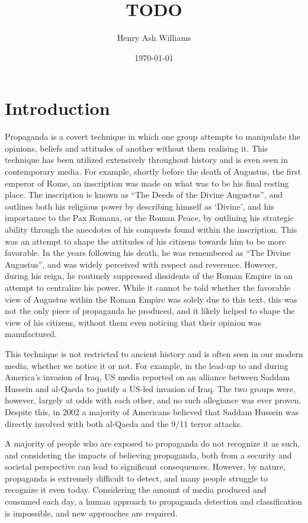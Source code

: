 \documentclass[twocolumn]{article}
\title{TODO}
\author{Henry Ash Williams}
\date{\today}
\begin{document}
\maketitle

\tableofcontents

\section{Introduction}

Propaganda is a covert technique in which one group attempts to manipulate the opinions, beliefs and attitudes of another without them realising it. This technique has been utilized extensively throughout history and is even seen in contemporary media. For example, shortly before the death of Augustus, the first emperor of Rome, an inscription was made on what was to be his final resting place. The inscription is known as ``The Deeds of the Divine Augustus'', and outlines both his religious power by describing himself as `Divine', and his importance to the Pax Romana, or the Roman Peace, by outlining his strategic ability through the anecdotes of his conquests found within the inscription. This was an attempt to shape the attitudes of his citizens towards him to be more favorable. In the years following his death, he was remembered as ``The Divine Augustus'', and was widely perceived with respect and reverence. However, during his reign, he routinely suppressed dissidents of the Roman Empire in an attempt to centralize his power. While it cannot be told whether the favorable view of Augustus within the Roman Empire was solely due to this text, this was not the only piece of propaganda he produced, and it likely helped to shape the view of his citizens, without them even noticing that their opinion was manufactured. 

This technique is not restricted to ancient history and is often seen in our modern media, whether we notice it or not. For example, in the lead-up to and during America's invasion of Iraq, US media reported on an alliance between Saddam Hussein and al-Qaeda to justify a US-led invasion of Iraq. The two groups were, however, largely at odds with each other, and no such allegiance was ever proven. Despite this, in 2002 a majority of Americans believed that Saddam Hussein was directly involved with both al-Qaeda and the 9/11 terror attacks. 

A majority of people who are exposed to propaganda do not recognize it as such, and considering the impacts of believing propaganda, both from a security and societal perspective can lead to significant consequences. However, by nature, propaganda is extremely difficult to detect, and many people struggle to recognize it even today. Considering the amount of media produced and consumed each day, a human approach to propaganda detection and classification is impossible, and new approaches are required. 
\end{document}
